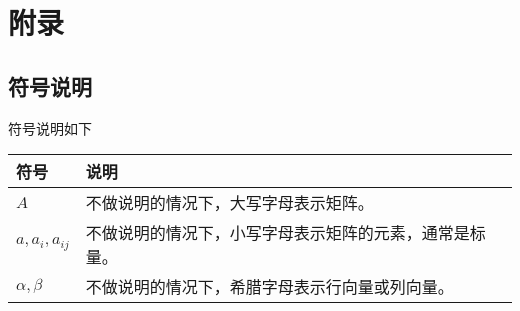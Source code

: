 \appendix

\chapter{附录}

\section{符号说明}

符号说明如下

\begin{table}[!hbt]
    \centering
    \begin{tabular}{p{2cm}p{8cm}}
        \toprule
        符号 & 说明 \\
        \midrule
        $A$ & 不做说明的情况下，大写字母表示矩阵。 \\
        $a,a_i,a_{ij}$ & 不做说明的情况下，小写字母表示矩阵的元素，通常是标量。 \\
        $\alpha,\beta$ & 不做说明的情况下，希腊字母表示行向量或列向量。 \\
        \bottomrule
    \end{tabular}
\end{table}
